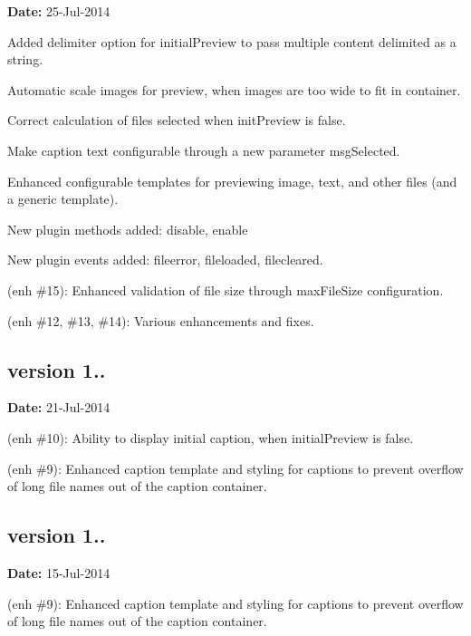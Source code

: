 {\bfseries Date\+:} 25-\/\+Jul-\/2014


\begin{DoxyItemize}
\item Added delimiter option for {\ttfamily initial\+Preview} to pass multiple content delimited as a string.
\item Automatic scale images for preview, when images are too wide to fit in container.
\item Correct calculation of files selected when {\ttfamily init\+Preview} is false.
\item Make caption text configurable through a new parameter {\ttfamily msg\+Selected}.
\item Enhanced configurable templates for previewing image, text, and other files (and a generic template).
\item New plugin methods added\+: {\ttfamily disable}, {\ttfamily enable}
\item New plugin events added\+: {\ttfamily fileerror}, {\ttfamily fileloaded}, {\ttfamily filecleared}.
\item (enh \#15)\+: Enhanced validation of file size through {\ttfamily max\+File\+Size} configuration.
\item (enh \#12, \#13, \#14)\+: Various enhancements and fixes.
\end{DoxyItemize}

\subsection*{version 1..}

{\bfseries Date\+:} 21-\/\+Jul-\/2014


\begin{DoxyItemize}
\item (enh \#10)\+: Ability to display initial caption, when initial\+Preview is false.
\item (enh \#9)\+: Enhanced caption template and styling for captions to prevent overflow of long file names out of the caption container.
\end{DoxyItemize}

\subsection*{version 1..}

{\bfseries Date\+:} 15-\/\+Jul-\/2014


\begin{DoxyItemize}
\item (enh \#9)\+: Enhanced caption template and styling for captions to prevent overflow of long file names out of the caption container.
\end{DoxyItemize}

